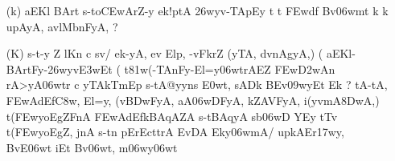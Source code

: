 \begin{itemize}
\begin{itemize}
          \item[({\dn k})]  {\dn aEKl\? BArt\? s\2-to\3CEwArZ-y ek!ptA\2 \326wyv-TApEy\2 t\? t\? \3FEwd\?f\? Bv\306wmt\? k\? k\? upAyA, avlMbnFyA, {\rs ?\re}} 
          
          \item[({\dn K})] {\dn s\2-t-y Z\? l\?Kn\? c sv\0/ ek-yA, ev Elp\?, -vFkrZ\2 {\rs (\re}yTA{\rs ,\re} d\?vnAgyA\0,{\rs )\re} {\rs (\re}\dn\dnnum {}  aEKl{\rs -\re}BArtFy{\rs -\re}\326wyv\3E3wEt {\rs (\re}\dn\dnnum {} t\381w(-TAnFy{\rs -\re}El=y\306wtrAEZ \3FEw\3D2wAn\? rA>yA\306wtr\? c yTAkTmEp s\2-tA@yyns\- \3E0wt\?, sADk\2 BEv\309wyEt Ek {\rs ?\re} tA-tA, \3FEwAd\?Ef\3C8w, El=y, {\rs (\re}v\3BDwFyA{\rs ,\re} aA\306wD\5FyA{\rs ,\re} kZA\0VFyA{\rs ,\re} i(y\?vmA\38DwA,{\rs )\re} t(\3FEwyoEgZFnA\2 \3FEwAd\?EfkBAqAZA\2 s\2-tBAqyA s\2b\306wD\2 YEy tT\4v t(\3FEwyoEgZ, jnA s\2-t\?n pErEcttrA EvDA Eky\306wmA/ upkAEr\317wy, BvE\306wt iEt Bv\306wt, m\306wy\306wt}
          \end{itemize}
\end{itemize}

